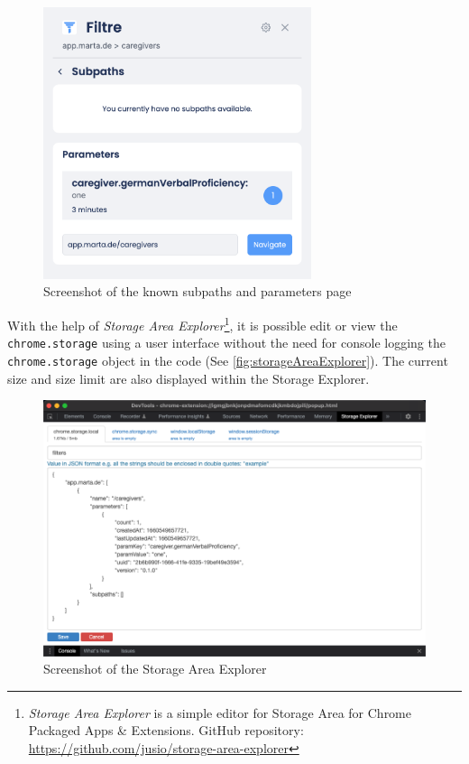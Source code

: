 \begin{figure}[H]
  \centering
  \includegraphics[width=0.7\textwidth]{assets/screenshot_filtre_parameters.png}
  \caption{Screenshot of the known subpaths and parameters page}
  \label{fig:filtreParameters}
\end{figure}

With the help of \emph{Storage Area Explorer}\footnote{\emph{Storage Area Explorer} is a simple editor for Storage Area for Chrome Packaged Apps \& Extensions. GitHub repository: \url{https://github.com/jusio/storage-area-explorer}}, it is possible edit or view the \texttt{chrome.storage} using a user interface without the need for console logging the \texttt{chrome.storage} object in the code (See \autoref{fig:storageAreaExplorer}). The current size and size limit are also displayed within the Storage Explorer.

\begin{figure}[H]
  \includegraphics[width=\textwidth]{assets/screenschot_storage_area_explorer.png}
  \caption{Screenshot of the Storage Area Explorer}
  \label{fig:storageAreaExplorer}
\end{figure}

